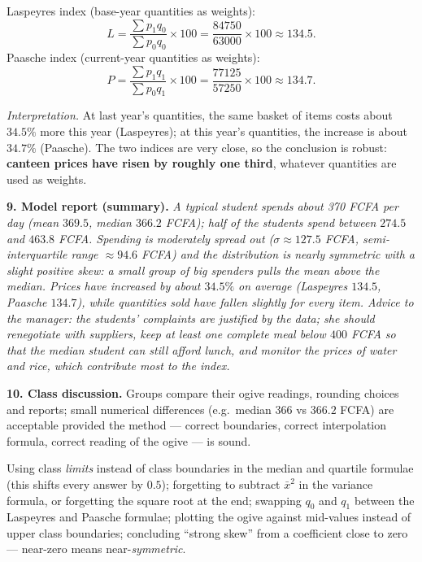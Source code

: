 \documentclass[11pt]{article}
\newcommand{\cle}[1]{{\popxbold\color{popdark}#1}}
\begin{document}
Laspeyres index (base-year quantities as weights):
\[ L = \frac{\sum p_1 q_0}{\sum p_0 q_0}\times 100 = \frac{84750}{63000}\times 100 \approx 134.5. \]
Paasche index (current-year quantities as weights):
\[ P = \frac{\sum p_1 q_1}{\sum p_0 q_1}\times 100 = \frac{77125}{57250}\times 100 \approx 134.7. \]

\emph{Interpretation.} At last year's quantities, the same basket of items costs about $34.5\%$ more this year (Laspeyres); at this year's quantities, the increase is about $34.7\%$ (Paasche). The two indices are very close, so the conclusion is robust: \textbf{canteen prices have risen by roughly one third}, whatever quantities are used as weights.

\textbf{9. Model report (summary).} \emph{A typical student spends about 370 FCFA per day (mean $369.5$, median $366.2$ FCFA); half of the students spend between $274.5$ and $463.8$ FCFA. Spending is moderately spread out ($\sigma \approx 127.5$ FCFA, semi-interquartile range $\approx 94.6$ FCFA) and the distribution is nearly symmetric with a slight positive skew: a small group of big spenders pulls the mean above the median. Prices have increased by about $34.5\%$ on average (Laspeyres $134.5$, Paasche $134.7$), while quantities sold have fallen slightly for every item. Advice to the manager: the students' complaints are justified by the data; she should renegotiate with suppliers, keep at least one complete meal below $400$ FCFA so that the median student can still afford lunch, and monitor the prices of water and rice, which contribute most to the index.}

\textbf{10. Class discussion.} Groups compare their ogive readings, rounding choices and reports; small numerical differences (e.g.\ median $366$ vs $366.2$ FCFA) are acceptable provided the method — correct boundaries, correct interpolation formula, correct reading of the ogive — is sound.

\begin{attention}
Using class \emph{limits} instead of \cle{class boundaries} in the median and quartile formulae (this shifts every answer by $0.5$); forgetting to subtract $\bar{x}^2$ in the variance formula, or forgetting the square root at the end; swapping $q_0$ and $q_1$ between the Laspeyres and Paasche formulae; plotting the ogive against mid-values instead of upper class boundaries; concluding ``strong skew'' from a coefficient close to zero — near-zero means near-\emph{symmetric}.
\end{attention}
\end{document}
